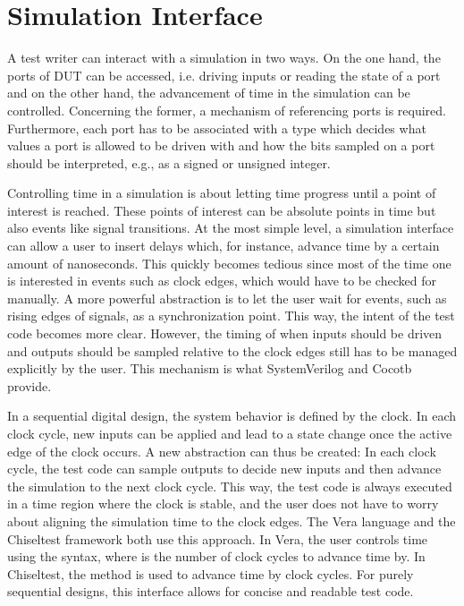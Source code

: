 \section{Simulation Interface} %

A test writer can interact with a simulation in two ways. On the one hand, the ports of DUT can be accessed, i.e.
driving inputs or reading the state of a port and on the other hand, the advancement of time in the simulation can be
controlled. Concerning the former, a mechanism of referencing ports is required. Furthermore, each port has to be
associated with a type which decides what values a port is allowed to be driven with and how the bits sampled on a
port should be interpreted, e.g., as a signed or unsigned integer.

Controlling time in a simulation is about letting time progress until a point of interest is reached. These points of interest can
be absolute points in time but also events like signal transitions. At the most simple level, a simulation interface
can allow a user to insert delays which, for instance, advance time by a certain amount of nanoseconds. This quickly becomes
tedious since most of the time one is interested in events such as clock edges, which would have to be checked for
manually. A more powerful abstraction is to let the user wait for events, such as rising edges of signals, as a
synchronization point. This way, the intent of the test code becomes more clear. However, the timing of when inputs
should be driven and outputs should be sampled relative to the clock edges still has to be managed explicitly by the
user. This mechanism is what SystemVerilog and Cocotb provide.

In a sequential digital design, the system behavior is defined by the clock. In each clock cycle, new inputs can be
applied and lead to a state change once the active edge of the clock occurs. A new abstraction can thus be created: In each clock cycle, the test code can sample outputs to decide new inputs and then advance the simulation to
the next clock cycle. This way, the test code is always executed in a time region where the clock is stable, and the
user does not have to worry about aligning the simulation time to the clock edges. The Vera \cite[Sec. 7]{flake2020a}
language and the Chiseltest \cite{chiseltest} framework both use this approach. In Vera, the user controls time using the
 syntax, where  is the number of clock cycles to advance time by. In Chiseltest, the
 method is used to advance time by  clock cycles. For purely sequential designs, this
interface allows for concise and readable test code.

